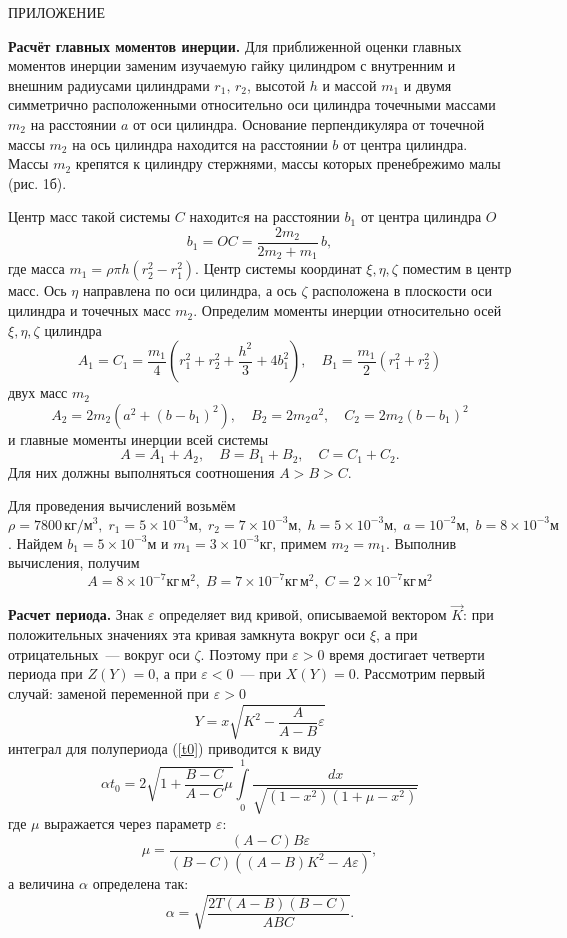\documentclass[14pt,a4paper]{extarticle}
\def\DS{\displaystyle}
\def\eps{\varepsilon}
\begin{document}
\smallskip

ПРИЛОЖЕНИЕ

{\bf Расчёт главных моментов инерции.} Для приближенной оценки главных моментов инерции заменим изучаемую гайку цилиндром с внутренним и внешним радиусами цилиндрами $r_1,\,r_2$, высотой $h$ и массой $m_1$ и двумя симметрично расположенными относительно оси цилиндра точечными массами $m_2$ на расстоянии $a$ от оси цилиндра. Основание перпендикуляра от точечной массы $m_2$ на ось цилиндра находится на расстоянии $b$ от центра цилиндра. Массы $m_2$ крепятся к цилиндру стержнями, массы которых пренебрежимо малы (рис. 1б). 

Центр масс такой системы $C$ находитcя на расстоянии $b_1$ от центра цилиндра $O$
$$
b_1=OC=\frac{2m_2}{2m_2+m_1}\,b,
$$
где масса $m_1=\rho\pi h(r_2^2-r_1^2).$
Центр системы координат $\xi,\eta,\zeta$ поместим в центр масс. Ось $\eta$ направлена по оси цилиндра, а ось $\zeta$ расположена в плоскости  оси цилиндра и точечных масс $m_2$. Определим моменты инерции относительно осей $\xi,\eta,\zeta$ цилиндра 
$$
A_1=C_1=\frac{m_1}{4}(r_1^2+r_2^2+\frac{h^2}{3}+4b_1^2),\quad B_1=\frac{m_1}{2}(r_1^2+r_2^2)
$$
двух масс $m_2$ 
$$
A_2=2m_2\left(a^2+(b-b_1)^2\right),\quad B_2=2m_2a^2,\quad C_2=2m_2(b-b_1)^2 
$$
и главные моменты инерции всей системы 
$$
A=A_1+A_2,\quad B=B_1+B_2,\quad C=C_1+C_2.
$$
Для них должны выполняться соотношения $A>B>C$.

Для проведения вычислений возьмём $\rho=7800\, кг/м^3,\;r_1=5\times 10^{-3}м,\;r_2=7\times 10^{-3}м,\;h=5\times 10^{-3}м,\;a=10^{-2}м,\;b=8\times 10^{-3}м$. Найдем $b_1=5\times 10^{-3}м$ и $m_1=3\times 10^{-3}кг$, примем $m_2=m_1$.\newline
Выполнив вычисления, получим
$$A=8\times 10^{-7}кг\,м^2,\;B=7\times 10^{-7}кг\,м^2,\;C=2\times 10^{-7}кг\,м^2$$

{\bf Расчет периода.} Знак $\varepsilon$ определяет вид кривой, описываемой вектором $\vec{K}$: при положительных значениях эта кривая замкнута вокруг оси $\xi$, а при отрицательных~--- вокруг оси $\zeta$. Поэтому при $\varepsilon>0$ время достигает четверти периода при $Z(Y)=0$, а при $\varepsilon<0$~--- при $X(Y)=0$. Рассмотрим первый случай:
заменой переменной при $\eps>0$ 
$$
Y=x\sqrt{K^2-\frac{A}{A-B}\eps}
$$
интеграл для полупериода (\ref{t0})  приводится к виду
$$
\DS \alpha t_0=2\sqrt{1+\frac{B-C}{A-C}\mu}\int\limits_0^1\frac{dx}{\sqrt{(1-x^2)(1+\mu-x^2)}}
$$
где $\mu$ выражается через параметр $\eps$:
$$\mu =\frac{\left( A-C\right) B\eps}{\left(
B-C\right) \left( \left( A-B\right) K^{2}-A\eps\right) },$$
а величина $\alpha$ определена так:
$$\alpha=\sqrt{\frac{2T(A-B)(B-C)}{ABC}}.$$
\end{document}
